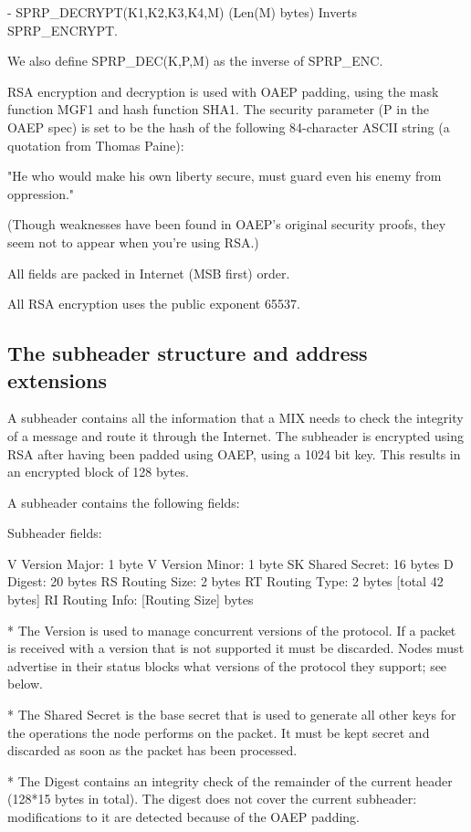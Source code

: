 - SPRP_DECRYPT(K1,K2,K3,K4,M) (Len(M) bytes) Inverts SPRP_ENCRYPT.

  We also define SPRP_DEC(K,P,M) as the inverse of SPRP_ENC.

RSA encryption and decryption is used with OAEP padding, using the
mask function MGF1 and hash function SHA1.  The security parameter (P
in the OAEP spec) is set to be the hash of the following 84-character
ASCII string (a quotation from Thomas Paine):

     "He who would make his own liberty secure, must guard even his
      enemy from oppression." 

(Though weaknesses have been found in OAEP's original security proofs,
they seem not to appear when you're using RSA.)

All fields are packed in Internet (MSB first) order.

All RSA encryption uses the public exponent 65537.

\subsection{The subheader structure and address extensions}

A subheader contains all the information that a MIX needs to check the
integrity of a message and route it through the Internet. The subheader
is encrypted using RSA after having been padded using OAEP, using a 1024
bit key. This results in an encrypted block of 128 bytes.

A subheader contains the following fields:

Subheader fields:

V   Version Major:   1 byte
V   Version Minor:   1 byte
SK  Shared Secret:   16 bytes
D   Digest:          20 bytes
RS  Routing Size:    2 bytes 
RT  Routing Type:    2 bytes [total 42 bytes]
RI  Routing Info:    [Routing Size] bytes

* The Version is used to manage concurrent versions of the
protocol. If a packet is received with a version that is not supported
it must be discarded. Nodes must advertise in their status blocks what
versions of the protocol they support; see below.

* The Shared Secret is the base secret that is used to generate all
other keys for the operations the node performs on the packet. It must be
kept secret and discarded as soon as the packet has been processed. 

* The Digest contains an integrity check of the remainder of the current
header (128*15 bytes in total). The digest does not cover the current
subheader: modifications to it are detected because of the OAEP padding.

